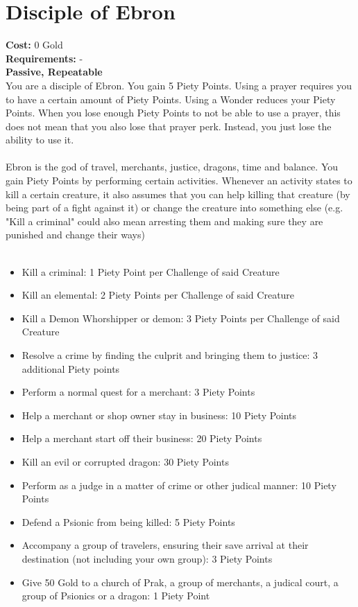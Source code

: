 \section{Disciple of Ebron}
\textbf{Cost:} 0 Gold\\
\textbf{Requirements:} - \\
\textbf{Passive, Repeatable}\\
You are a disciple of Ebron. You gain 5 Piety Points. Using a prayer requires you to have a certain amount of Piety Points. Using a Wonder reduces your Piety Points. When you lose enough Piety Points to not be able to use a prayer, this does not mean that you also lose that prayer perk. Instead, you just lose the ability to use it.\\
\\
Ebron is the god of travel, merchants, justice, dragons, time and balance. You gain Piety Points by performing certain activities. Whenever an activity states to kill a certain creature, it also assumes that you can help killing that creature (by being part of a fight against it) or change the creature into something else (e.g. "Kill a criminal" could also mean arresting them and making sure they are punished and change their ways)\\
\\
\begin{itemize}
	\item Kill a criminal: 1 Piety Point per Challenge of said Creature
	\item Kill an elemental: 2 Piety Points per Challenge of said Creature
	\item Kill a Demon Whorshipper or demon: 3 Piety Points per Challenge of said Creature
	\item Resolve a crime by finding the culprit and bringing them to justice: 3 additional Piety points
	\item Perform a normal quest for a merchant: 3 Piety Points
	\item Help a merchant or shop owner stay in business: 10 Piety Points
	\item Help a merchant start off their business: 20 Piety Points
	\item Kill an evil or corrupted dragon: 30 Piety Points
	\item Perform as a judge in a matter of crime or other judical manner: 10 Piety Points
	\item Defend a Psionic from being killed: 5 Piety Points
	\item Accompany a group of travelers, ensuring their save arrival at their destination (not including your own group): 3 Piety Points
	\item Give 50 Gold to a church of Prak, a group of merchants, a judical court, a group of Psionics or a dragon: 1 Piety Point
\end{itemize}

